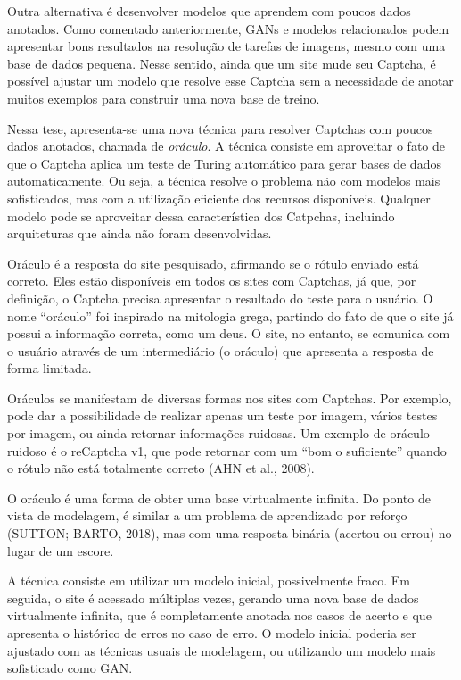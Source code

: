 \documentclass[12pt,twoside,brazilian]{book}
\begin{document}
Outra alternativa é desenvolver modelos que aprendem com poucos dados
anotados. Como comentado anteriormente, GANs e modelos relacionados
podem apresentar bons resultados na resolução de tarefas de imagens,
mesmo com uma base de dados pequena. Nesse sentido, ainda que um site
mude seu Captcha, é possível ajustar um modelo que resolve esse Captcha
sem a necessidade de anotar muitos exemplos para construir uma nova base
de treino.

Nessa tese, apresenta-se uma nova técnica para resolver Captchas com
poucos dados anotados, chamada de \emph{oráculo}. A técnica consiste em
aproveitar o fato de que o Captcha aplica um teste de Turing automático
para gerar bases de dados automaticamente. Ou seja, a técnica resolve o
problema não com modelos mais sofisticados, mas com a utilização
eficiente dos recursos disponíveis. Qualquer modelo pode se aproveitar
dessa característica dos Catpchas, incluindo arquiteturas que ainda não
foram desenvolvidas.

Oráculo é a resposta do site pesquisado, afirmando se o rótulo enviado
está correto. Eles estão disponíveis em todos os sites com Captchas, já
que, por definição, o Captcha precisa apresentar o resultado do teste
para o usuário. O nome ``oráculo'' foi inspirado na mitologia grega,
partindo do fato de que o site já possui a informação correta, como um
deus. O site, no entanto, se comunica com o usuário através de um
intermediário (o oráculo) que apresenta a resposta de forma limitada.

Oráculos se manifestam de diversas formas nos sites com Captchas. Por
exemplo, pode dar a possibilidade de realizar apenas um teste por
imagem, vários testes por imagem, ou ainda retornar informações
ruidosas. Um exemplo de oráculo ruidoso é o reCaptcha v1, que pode
retornar com um ``bom o suficiente'' quando o rótulo não está totalmente
correto (AHN et al., 2008).

O oráculo é uma forma de obter uma base virtualmente infinita. Do ponto
de vista de modelagem, é similar a um problema de aprendizado por
reforço (SUTTON; BARTO, 2018), mas com uma resposta binária (acertou ou
errou) no lugar de um escore.

A técnica consiste em utilizar um modelo inicial, possivelmente fraco.
Em seguida, o site é acessado múltiplas vezes, gerando uma nova base de
dados virtualmente infinita, que é completamente anotada nos casos de
acerto e que apresenta o histórico de erros no caso de erro. O modelo
inicial poderia ser ajustado com as técnicas usuais de modelagem, ou
utilizando um modelo mais sofisticado como GAN.
\end{document}
